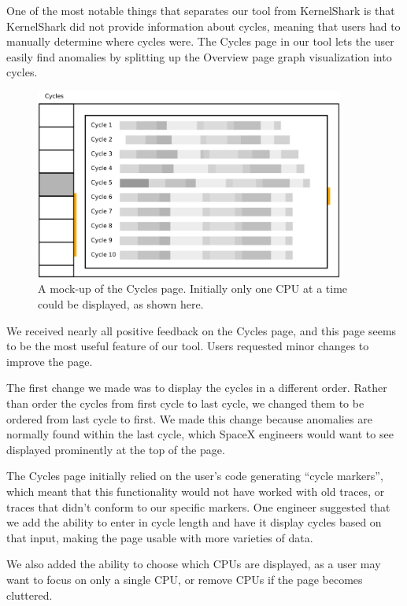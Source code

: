 \documentclass{hmcclinic}
\begin{document}
One of the most notable things that separates our tool from KernelShark is that
KernelShark did not provide information about cycles, meaning that users had to
manually determine where cycles were.
The Cycles page in our tool lets the user easily find anomalies by splitting up
the Overview page graph visualization into cycles.

\begin{figure}[H]
\begin{center}
\includegraphics[width=4in]{oldcycles.png}
\caption{A mock-up of the Cycles page. Initially only one CPU at a time could be
displayed, as shown here.}
\end{center}
\end{figure}

We received nearly all positive feedback on the Cycles page, and this page seems to
be the most useful feature of our tool. Users requested minor changes to improve
the page.

The first change we made was to display the cycles in a different order. Rather than order the cycles from
first cycle to last cycle, we changed them to be ordered from last cycle to first.
We made this change because anomalies are normally found within the last cycle,
which SpaceX engineers would want to see displayed prominently at the top of the
page.

The Cycles page initially relied on the user's code generating ``cycle
markers'', which meant that this functionality would not have worked with old
traces, or traces that didn't conform to our specific markers. One engineer
suggested that we add the ability to enter in cycle length and have it display
cycles based on that input, making the page usable with more
varieties of data.

We also added the ability to choose which CPUs are displayed, as a user may
want to focus on only a single CPU, or remove CPUs if the page becomes cluttered.
\end{document}

